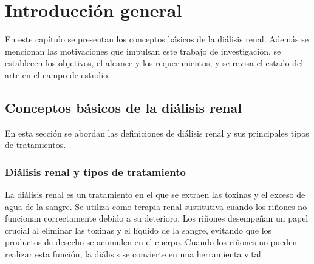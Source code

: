 
\chapter{Introducción general} %

\label{Chapter1} %
\label{IntroGeneral}


\newcommand{\keyword}[1]{\textbf{#1}}
\newcommand{\tabhead}[1]{\textbf{#1}}
\newcommand{\code}[1]{\texttt{#1}}
\newcommand{\file}[1]{\texttt{\bfseries#1}}
\newcommand{\option}[1]{\texttt{\itshape#1}}
\newcommand{\grados}{$^{\circ}$}





En este capítulo se presentan los conceptos básicos de la diálisis renal. Además se mencionan las motivaciones que impulsan este trabajo de investigación, se establecen los objetivos, el alcance y los requerimientos, y se revisa el estado del arte en el campo de estudio.

\section{Conceptos básicos de la diálisis renal}

En esta sección se abordan las definiciones de diálisis renal y sus principales tipos de tratamientos.

\subsection{Diálisis renal y tipos de tratamiento}

La diálisis renal es un tratamiento en el que se extraen las toxinas y el exceso de agua de la sangre. Se utiliza como terapia renal sustitutiva cuando los riñones no funcionan correctamente debido a su deterioro. Los riñones desempeñan un papel crucial al eliminar las toxinas y el líquido de la sangre, evitando que los productos de desecho se acumulen en el cuerpo. Cuando los riñones no pueden realizar esta función, la diálisis se convierte en una herramienta vital.

